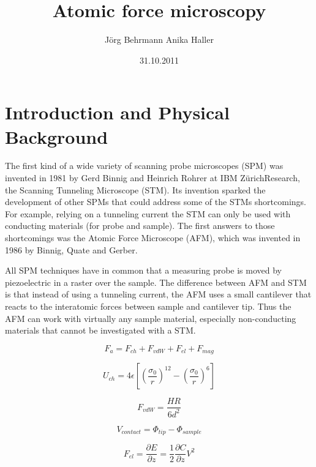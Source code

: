 \documentclass{a4paper,twoside,11pt}[scrartcl]
\begin{document}
\title{Atomic force microscopy}
\author{J\"org Behrmann \qquad Anika Haller}
\date{31.10.2011}
\maketitle
\tableofcontents
\thispagestyle{empty}
\clearpage

\section{Introduction and Physical Background}

The first kind of a wide variety of scanning probe microscopes (SPM) was invented in 1981 by Gerd Binnig and Heinrich Rohrer at IBM ZürichResearch, the Scanning Tunneling Microscope (STM). Its invention sparked the development of other SPMs that could address some of the STMs shortcomings. For example, relying on a tunneling current the STM can only be used with conducting materials (for probe and sample).
The first answers to those shortcomings was the Atomic Force Microscope (AFM), which was invented in 1986 by Binnig, Quate and Gerber.

All SPM techniques have in common that a measuring probe is moved by piezoelectric in a raster over the sample. The difference between AFM and STM is that instead of using a tunneling current, the AFM uses a small cantilever that reacts to the interatomic forces between sample and cantilever tip. Thus the AFM can work with virtually any sample material, especially non-conducting materials that cannot be investigated with a STM.

\begin{equation}
F_{a}=F_{ch}+F_{vdW}+F_{el}+F_{mag}
\end{equation}

\begin{equation}
U_{ch}=4\epsilon\left[\left(\frac{\sigma_{0}}{r}\right)^{12}-\left(\frac{\sigma_{0}}{r}\right)^{6}\right]
\end{equation}

\begin{equation}
F_{vdW}=\frac{HR}{6d^{2}}
\end{equation}

\begin{equation}
V_{contact}=\Phi_{tip}-\Phi_{sample}
\end{equation}

\begin{equation}
F_{el}=\frac{\partial E}{\partial z}=\frac{1}{2}\frac{\partial C}{\partial z}V^{2}
\end{equation}
\end{document}
